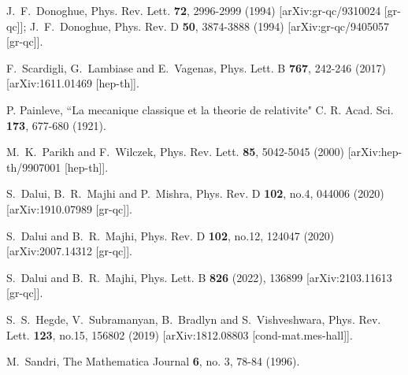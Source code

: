 \documentclass[aps,prd,showpacs,nofootinbib,floats,floatfix,preprintnumbers,groupedaddress,twocolumn]{revtex4-1}
\begin{document}
\begin{thebibliography}{9}
J.~F.~Donoghue,
Phys. Rev. Lett. \textbf{72}, 2996-2999 (1994)
[arXiv:gr-qc/9310024 [gr-qc]];
J.~F.~Donoghue,
Phys. Rev. D \textbf{50}, 3874-3888 (1994)
[arXiv:gr-qc/9405057 [gr-qc]].




 F.~Scardigli, G.~Lambiase and E.~Vagenas,
Phys. Lett. B \textbf{767}, 242-246 (2017)
[arXiv:1611.01469 [hep-th]].

P. Painleve, ``La mecanique classique et la theorie de relativite" C. R. Acad. Sci. \textbf{173}, 677-680 (1921).

M.~K.~Parikh and F.~Wilczek,
Phys. Rev. Lett. \textbf{85}, 5042-5045 (2000)
[arXiv:hep-th/9907001 [hep-th]].


S.~Dalui, B.~R.~Majhi and P.~Mishra,
Phys. Rev. D \textbf{102}, no.4, 044006 (2020)
[arXiv:1910.07989 [gr-qc]].

S.~Dalui and B.~R.~Majhi,
Phys. Rev. D \textbf{102}, no.12, 124047 (2020)
[arXiv:2007.14312 [gr-qc]].

S.~Dalui and B.~R.~Majhi,
Phys. Lett. B \textbf{826} (2022), 136899
[arXiv:2103.11613 [gr-qc]].

S.~S.~Hegde, V.~Subramanyan, B.~Bradlyn and S.~Vishveshwara,
Phys. Rev. Lett. \textbf{123}, no.15, 156802 (2019)
[arXiv:1812.08803 [cond-mat.mes-hall]].

M.~Sandri, 
The Mathematica Journal {\bf 6}, no. 3, 78-84 (1996).


\end{thebibliography}	
\end{document}
